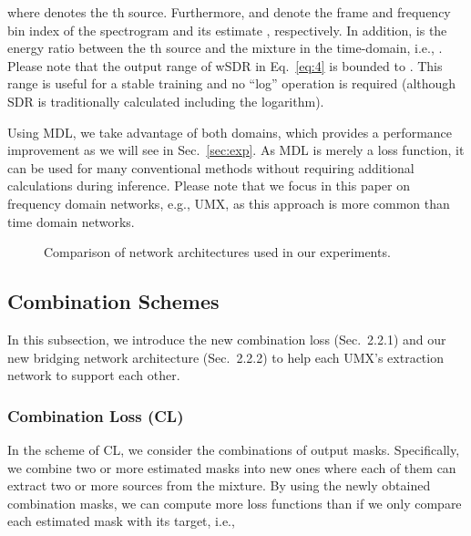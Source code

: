 \documentclass{article}
\begin{document}
where  denotes the th source.
Furthermore,  and  denote the frame and frequency bin index of the spectrogram  and its estimate , respectively.
In addition,  is the energy ratio between the th source  and the mixture  in the time-domain, i.e., .
Please note that the output range of wSDR in Eq.~\eqref{eq:4} is bounded to . This range is useful for a stable training and no ``log'' operation is required (although SDR is traditionally calculated including the logarithm).

Using MDL, we take advantage of both domains, which provides a performance improvement as we will see in Sec.~\ref{sec:exp}. 
As MDL is merely a loss function, it can be used for many conventional methods without requiring additional calculations during inference. 
Please note that we focus in this paper on frequency domain networks, e.g., UMX, as this approach is more common than time domain networks.

\begin{figure*}[t]
\centering
{}
\hspace{+3mm}


\caption{Comparison of network architectures used in our experiments.}
  \label{fig:comp_archi}
  \vspace{-3mm}
\end{figure*}

\vspace{-1mm}
\subsection{Combination Schemes}
\label{subsec:combi}
\vspace{-1mm}
In this subsection, we introduce the new combination loss (Sec.~2.2.1) and our new bridging network architecture (Sec.~2.2.2) to help each UMX's extraction network to support each other.

\vspace{-1mm}
\subsubsection{Combination Loss (CL)}
\label{subsec:CL}
\vspace{-1mm}
In the scheme of CL, we consider the combinations of output masks.
Specifically, we combine two or more estimated masks into new ones where each of them can extract two or more sources from the mixture.
By using the newly obtained combination masks, we can compute more loss functions than if we only compare each estimated mask with its target, i.e.,
\end{document}
